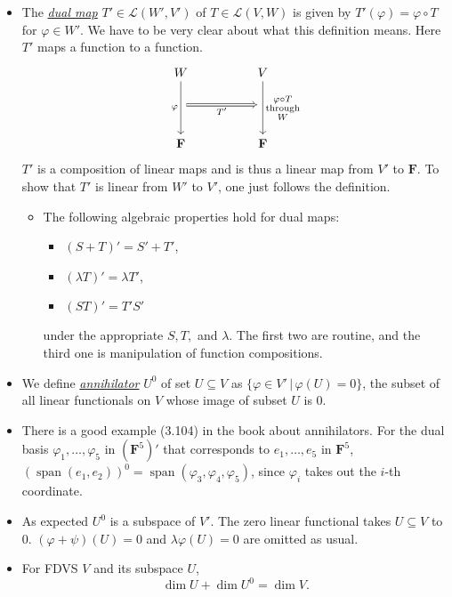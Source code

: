 \documentclass[11pt]{article}
\newcommand{\where}{\,|\,}
\newcommand{\df}[1]{\ul{\textit{\textsf{#1}}}}
\newcommand{\F}{\mathbf{F}}
\newcommand{\s}{\operatorname{span}}
\renewcommand{\d}{\dim}
\newcommand{\LVW}{\mathcal{L}(V,W)}
\renewcommand{\phi}{\varphi}
\begin{document}
\begin{itemize}
    \item The \df{dual map} $T' \in \mathcal{L}(W',V')$ of $T \in \LVW$ is given by $T'(\phi)=\phi \circ T$ for $\phi \in W'$. We have to be very clear about what this definition means. Here $T'$ maps a function to a function.
    \begin{equation*}
        \begin{tikzcd}
            W \arrow[dd, "\phi"'] &  & V 
            \arrow[dd, "\substack{\phi \circ T \\ \text{through} \\ W}"] \\
            {} \arrow[rr, "T'"', Rightarrow] &  & {} \\
            \F &  & \F
        \end{tikzcd}
    \end{equation*}
    $T'$ is a composition of linear maps and is thus a linear map from $V'$ to $\F$. To show that $T'$ is linear from $W'$ to $V'$, one just follows the definition.
    \begin{itemize}
        \item The following algebraic properties hold for dual maps:
        \begin{itemize}
            \item $(S+T)'=S'+T'$,
            \item $(\lambda T)'=\lambda T'$,
            \item $(ST)'=T'S'$
        \end{itemize}
        under the appropriate $S,T,$ and $\lambda$. The first two are routine, and the third one is manipulation of function compositions.
    \end{itemize}
    \item We define \df{annihilator} $U^0$ of set $U \subseteq V$ as $\{\phi \in V' \where \phi(U)=0\}$, the subset of all linear functionals on $V$ whose image of subset $U$ is 0.
    \item There is a good example (3.104) in the book about annihilators. For the dual basis $\phi_1,\dots,\phi_5$ in $(\F^5)'$ that corresponds to $e_1,\dots,e_5$ in $\F^5$, $(\s(e_1,e_2))^0 = \s(\phi_3,\phi_4,\phi_5)$, since $\phi_i$ takes out the $i$-th coordinate.
    \item As expected $U^0$ is a subspace of $V'$. The zero linear functional takes $U \subseteq V$ to $0$. $(\phi+\psi)(U) = 0$ and $\lambda\phi(U) = 0$ are omitted as usual.
    \item For FDVS $V$ and its subspace $U$, \[\d U + \d U^0 = \d V.\]
    

\end{itemize}
\end{document}
